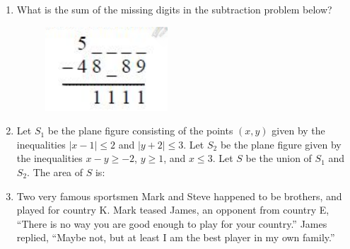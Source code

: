 \documentclass[journal]{IEEEtran}
\begin{document}
\begin{enumerate}[leftmargin=0pt]
    
    
    \item What is the sum of the missing digits in the subtraction problem below?
    \hfill{}
    \begin{figure}[h]
    \centering
    \includegraphics[width=0.2\columnwidth]{Figs/image (32).png}
    \caption*{}
    \label{fig:62}
    \end{figure}
   
    \begin{enumerate}
    \end{enumerate}





  
    \item Let $S_1$ be the plane figure consisting of the points $(x, y)$ given by the inequalities $|x - 1| \leq 2$ and $|y + 2| \leq 3$. Let $S_2$ be the plane figure given by the inequalities $x - y \geq -2$, $y \geq 1$, and $x \leq 3$. Let $S$ be the union of $S_1$ and $S_2$. The area of $S$ is:
    \hfill{}
    \begin{enumerate}
    \end{enumerate}



  
    \item Two very famous sportsmen Mark and Steve happened to be brothers, and played for country K. Mark teased James, an opponent from country E, ``There is no way you are good enough to play for your country.'' James replied, ``Maybe not, but at least I am the best player in my own family.''


\end{enumerate}
\end{document}
